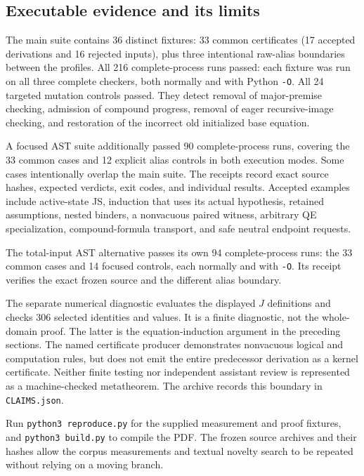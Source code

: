 \documentclass[11pt,letterpaper]{article}
\theoremstyle{definition}\newtheorem{definition}[theorem]{Definition}
\theoremstyle{remark}\newtheorem{remark}[theorem]{Remark}
\newcommand{\file}[1]{{\small\nolinkurl{#1}}}
\begin{document}
\subsection{Executable evidence and its limits}
The main suite contains 36 distinct fixtures: 33 common certificates
(17 accepted derivations and 16 rejected inputs), plus three intentional
raw-alias boundaries between the profiles. All 216 complete-process
runs passed: each fixture was run on all three complete checkers, both
normally and with Python \texttt{-O}. All 24 targeted mutation controls
passed. They detect removal of major-premise checking, admission of
compound progress, removal of eager recursive-image checking, and
restoration of the incorrect old initialized base equation.

A focused AST suite additionally passed 90 complete-process runs,
covering the 33 common cases and 12 explicit alias controls in both
execution modes. Some cases intentionally overlap the main suite.
The receipts record exact source hashes, expected verdicts, exit codes,
and individual results. Accepted examples include active-state JS,
induction that uses its actual hypothesis, retained assumptions, nested
binders, a nonvacuous paired witness, arbitrary QE specialization,
compound-formula transport, and safe neutral endpoint requests.

The total-input AST alternative passes its own 94 complete-process runs:
the 33 common cases and 14 focused controls, each normally and with
\texttt{-O}. Its receipt verifies the exact frozen source and the
different alias boundary.

The separate numerical diagnostic evaluates the displayed $J$ definitions
and checks 306 selected identities and values. It is a finite diagnostic,
not the whole-domain proof. The latter is the equation-induction argument
in the preceding sections. The named certificate producer demonstrates
nonvacuous logical and computation rules, but does not emit the entire
predecessor derivation as a kernel certificate. Neither finite testing nor
independent assistant review is represented as a machine-checked
metatheorem. The archive records this boundary in \file{CLAIMS.json}.

Run \texttt{python3 reproduce.py} for the supplied measurement and proof
fixtures, and \texttt{python3 build.py} to compile the PDF. The frozen
source archives and their hashes allow the corpus measurements and
textual novelty search to be repeated without relying on a moving branch.


\end{document}
